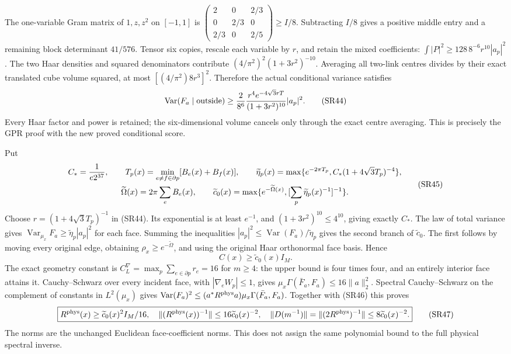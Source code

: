\documentclass[11pt]{article}
\begin{document}
The one-variable Gram matrix of \(1,z,z^2\) on \([-1,1]\) is
\(\left(\begin{smallmatrix}2&0&2/3\\0&2/3&0\\2/3&0&2/5\end{smallmatrix}\right)\ge I/8\).
Subtracting \(I/8\) gives a positive middle entry and a remaining block determinant \(41/576\). Tensor six copies, rescale each variable by \(r\), and retain the mixed coefficients: \(\int|P|^2\ge128\,8^{-6}r^{10}|a_p|^2\). The two Haar densities and squared denominators contribute \((4/\pi^2)^2(1+3r^2)^{-10}\). Averaging all two-link centres divides by their exact translated cube volume squared, at most \([(4/\pi^2)8r^3]^2\). Therefore the actual conditional variance satisfies
\[
\operatorname{Var}(F_a\mid\hbox{outside})
\ge {2\over8^6}{r^4e^{-4\sqrt3rT}\over(1+3r^2)^{10}}|a_p|^2.
\tag{SR44}
\]
Every Haar factor and power is retained; the six-dimensional volume cancels only through the exact centre averaging. This is precisely the GPR proof with the new proved conditional score.

Put
\[
\begin{gathered}
C_*={1\over e2^{37}},\qquad
T_p(x)=\min_{e\ne f\in\partial p}[B_e(x)+B_f(x)],\qquad
\widetilde\eta_p(x)=\max\{e^{-2\pi T_p},C_*(1+4\sqrt3T_p)^{-4}\},\\
\widetilde\Omega(x)=2\pi\sum_eB_e(x),\qquad
\widetilde c_0(x)=\max\{e^{-\widetilde\Omega(x)},[\sum_p\widetilde\eta_p(x)^{-1}]^{-1}\}.
\end{gathered}\tag{SR45}
\]
Choose \(r=(1+4\sqrt3T_p)^{-1}\) in (SR44). Its exponential is at least \(e^{-1}\), and \((1+3r^2)^{10}\le4^{10}\), giving exactly \(C_*\). The law of total variance gives \(\operatorname{Var}_{\mu_x}F_a\ge\widetilde\eta_p|a_p|^2\) for each face. Summing the inequalities \(|a_p|^2\le\operatorname{Var}(F_a)/\widetilde\eta_p\) gives the second branch of \(\widetilde c_0\). The first follows by moving every original edge, obtaining \(\rho_x\ge e^{-\widetilde\Omega}\), and using the original Haar orthonormal face basis. Hence
\[
C(x)\ge\widetilde c_0(x)I_M.
\tag{SR46}
\]
The exact geometry constant is \(C_L^\nabla=\max_p\sum_{e\in\partial p}r_e=16\) for \(m\ge4\): the upper bound is four times four, and an entirely interior face attains it. Cauchy–Schwarz over every incident face, with \(|\nabla_eW_p|\le1\), gives \(\mu_x\Gamma(\bar F_a,F_a)\le16\|a\|_2^2\). Spectral Cauchy–Schwarz on the complement of constants in \(L^2(\mu_x)\) gives
\(\operatorname{Var}(F_a)^2\le(a^*R^{\rm phys}a)\mu_x\Gamma(\bar F_a,F_a)\).
Together with (SR46) this proves
\[
\boxed{R^{\rm phys}(x)\ge\widetilde c_0(x)^2I_M/16,\quad
\|(R^{\rm phys}(x))^{-1}\|\le16\widetilde c_0(x)^{-2},\quad
\|D(m^{-1})\|=\|(2R^{\rm phys})^{-1}\|\le8\widetilde c_0(x)^{-2}.}
\tag{SR47}
\]
The norms are the unchanged Euclidean face-coefficient norms. This does not assign the same polynomial bound to the full physical spectral inverse.
\end{document}
